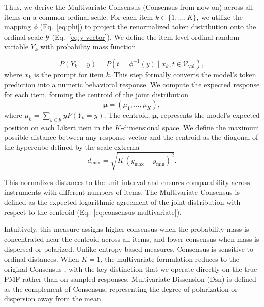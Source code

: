 Thus, we derive the Multivariate Consensus (Consensus from now on) across all items on a common ordinal scale. 
For each item $k \in \{1,\dots,K\}$, we utilize the mapping $\phi$ (Eq.~\ref{eq:phi}) to project the renormalized token distribution onto the ordinal scale $\mathcal{Y}$ (Eq.~\ref{eq:y-vector}). We define the item-level ordinal random variable $Y_k$ with probability mass function

\begin{equation}
\label{eq:phi-inverse-mapping}
    P(Y_k = y) = P\left(t = \phi^{-1}(y) \mid x_k, t \in \mathcal{V}_{\text{val}}\right),
\end{equation}
where $x_k$ is the prompt for item $k$. This step formally converts the model's token prediction into a numeric behavioral response.
We compute the expected response for each item, forming the centroid of the joint distribution
\begin{equation}
\label{eq:centroid}
    \boldsymbol{\mu} = (\mu_1, \dots, \mu_K),
\end{equation}
where $\mu_k = \sum_{y \in \mathcal{Y}} y P(Y_k = y)$.
The centroid, $\boldsymbol{\mu}$, represents the model's expected position on each Likert item in the $K$-dimensional space. We define the maximum possible distance between any response vector and the centroid as the diagonal of the hypercube defined by the scale extrema
\begin{equation}
\label{eq:d-max}
    d_{\max} = \sqrt{K \,(y_{\max} - y_{\min})^2}.
\end{equation}

This normalizes distances to the unit interval and ensures comparability across instruments with different numbers of items. The Multivariate Consensus is defined as the expected logarithmic agreement of the joint distribution with respect to the centroid (Eq.~\ref{eq:consensus-multivariate}).



Intuitively, this measure assigns higher consensus when the probability mass is concentrated near the centroid across all items, and lower consensus when mass is dispersed or polarized. Unlike entropy-based measures, Consensus is sensitive to ordinal distances. When $K=1$, the multivariate formulation reduces to the original Consensus \citep{tastle2007consensus}, with the key distinction that we operate directly on the true PMF rather than on sampled responses.
Multivariate Dissension ($\mathrm{Dsn}$) is defined as 
the complement of Consensus, 
representing the degree of polarization or 
dispersion away from the mean.

